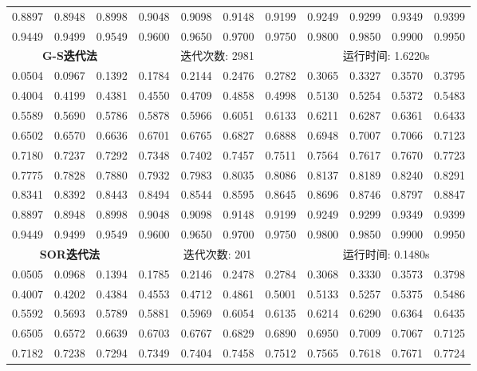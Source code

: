 \documentclass{article}
\begin{document}
\begin{table}[H]
\begin{tabular}{|*{11}{c}|}
		0.8897 & 0.8948 & 0.8998 & 0.9048 & 0.9098 & 0.9148 & 0.9199 & 0.9249 & 0.9299 & 0.9349 & 0.9399 \\
		0.9449 & 0.9499 & 0.9549 & 0.9600 & 0.9650 & 0.9700 & 0.9750 & 0.9800 & 0.9850 & 0.9900 & 0.9950 \\
		\hline
		\multicolumn{3}{|c}{\textbf{G-S迭代法}} & \multicolumn{4}{|c}{迭代次数: 2981}\ & \multicolumn{4}{|c|}{运行时间: 1.6220s}\\
		\hline
		0.0504 & 0.0967 & 0.1392 & 0.1784 & 0.2144 & 0.2476 & 0.2782 & 0.3065 & 0.3327 & 0.3570 & 0.3795 \\
		0.4004 & 0.4199 & 0.4381 & 0.4550 & 0.4709 & 0.4858 & 0.4998 & 0.5130 & 0.5254 & 0.5372 & 0.5483 \\
		0.5589 & 0.5690 & 0.5786 & 0.5878 & 0.5966 & 0.6051 & 0.6133 & 0.6211 & 0.6287 & 0.6361 & 0.6433 \\
		0.6502 & 0.6570 & 0.6636 & 0.6701 & 0.6765 & 0.6827 & 0.6888 & 0.6948 & 0.7007 & 0.7066 & 0.7123 \\
		0.7180 & 0.7237 & 0.7292 & 0.7348 & 0.7402 & 0.7457 & 0.7511 & 0.7564 & 0.7617 & 0.7670 & 0.7723 \\
		0.7775 & 0.7828 & 0.7880 & 0.7932 & 0.7983 & 0.8035 & 0.8086 & 0.8137 & 0.8189 & 0.8240 & 0.8291 \\
		0.8341 & 0.8392 & 0.8443 & 0.8494 & 0.8544 & 0.8595 & 0.8645 & 0.8696 & 0.8746 & 0.8797 & 0.8847 \\
		0.8897 & 0.8948 & 0.8998 & 0.9048 & 0.9098 & 0.9148 & 0.9199 & 0.9249 & 0.9299 & 0.9349 & 0.9399 \\
		0.9449 & 0.9499 & 0.9549 & 0.9600 & 0.9650 & 0.9700 & 0.9750 & 0.9800 & 0.9850 & 0.9900 & 0.9950 \\
		\hline
		\multicolumn{3}{|c}{\textbf{SOR迭代法}} & \multicolumn{4}{|c}{迭代次数: 201}\ & \multicolumn{4}{|c|}{运行时间: 0.1480s}\\
		\hline
		0.0505 & 0.0968 & 0.1394 & 0.1785 & 0.2146 & 0.2478 & 0.2784 & 0.3068 & 0.3330 & 0.3573 & 0.3798 \\
		0.4007 & 0.4202 & 0.4384 & 0.4553 & 0.4712 & 0.4861 & 0.5001 & 0.5133 & 0.5257 & 0.5375 & 0.5486 \\
		0.5592 & 0.5693 & 0.5789 & 0.5881 & 0.5969 & 0.6054 & 0.6135 & 0.6214 & 0.6290 & 0.6364 & 0.6435 \\
		0.6505 & 0.6572 & 0.6639 & 0.6703 & 0.6767 & 0.6829 & 0.6890 & 0.6950 & 0.7009 & 0.7067 & 0.7125 \\
		0.7182 & 0.7238 & 0.7294 & 0.7349 & 0.7404 & 0.7458 & 0.7512 & 0.7565 & 0.7618 & 0.7671 & 0.7724 \\

\end{tabular}
\end{table}
\end{document}
